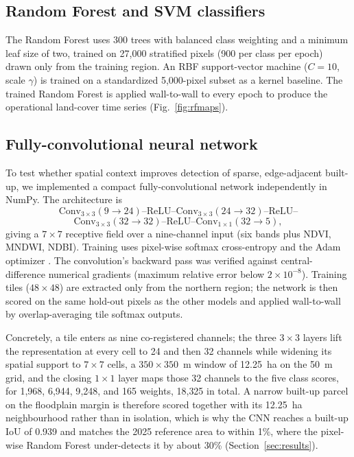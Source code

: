 \documentclass[journal]{IEEEtran}
\begin{document}
\subsection{Random Forest and SVM classifiers}
The Random Forest \cite{breiman2001random} uses 300 trees with balanced class weighting and a minimum leaf size of two, trained on 27{,}000 stratified pixels (900 per class per epoch) drawn only from the training region. An RBF support-vector machine \cite{cortes1995svm} ($C=10$, scale $\gamma$) is trained on a standardized 5{,}000-pixel subset as a kernel baseline. The trained Random Forest is applied wall-to-wall to every epoch to produce the operational land-cover time series (Fig.~\ref{fig:rfmaps}).

\subsection{Fully-convolutional neural network}
To test whether spatial context improves detection of sparse, edge-adjacent built-up, we implemented a compact fully-convolutional network \cite{long2015fully} independently in NumPy. The architecture is
\[
\text{Conv}_{3\times3}(9{\to}24)\text{--ReLU--}\text{Conv}_{3\times3}(24{\to}32)\text{--ReLU--}
\]
\[
\text{Conv}_{3\times3}(32{\to}32)\text{--ReLU--}\text{Conv}_{1\times1}(32{\to}5),
\]
giving a $7\times7$ receptive field over a nine-channel input (six bands plus NDVI, MNDWI, NDBI). Training uses pixel-wise softmax cross-entropy and the Adam optimizer \cite{kingma2015adam}. The convolution's backward pass was verified against central-difference numerical gradients (maximum relative error below $2\times10^{-8}$). Training tiles ($48\times48$) are extracted only from the northern region; the network is then scored on the same hold-out pixels as the other models and applied wall-to-wall by overlap-averaging tile softmax outputs.

Concretely, a tile enters as nine co-registered channels; the three $3\times3$ layers lift the representation at every cell to 24 and then 32 channels while widening its spatial support to $7\times7$ cells, a $350\times350$~m window of 12.25~ha on the 50~m grid, and the closing $1\times1$ layer maps those 32 channels to the five class scores, for 1{,}968, 6{,}944, 9{,}248, and 165 weights, 18{,}325 in total. A narrow built-up parcel on the floodplain margin is therefore scored together with its 12.25~ha neighbourhood rather than in isolation, which is why the CNN reaches a built-up IoU of 0.939 and matches the 2025 reference area to within 1\%, where the pixel-wise Random Forest under-detects it by about 30\% (Section~\ref{sec:results}).
\end{document}
